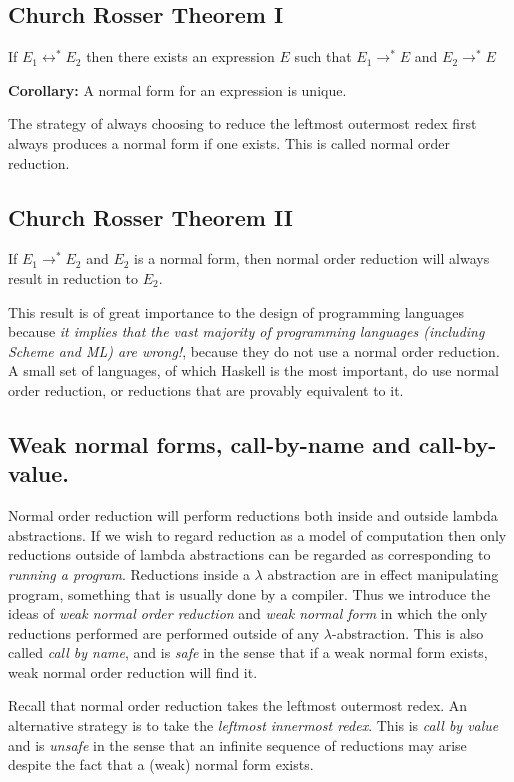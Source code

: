\subsection{Church Rosser Theorem I}

If $E_1\longleftrightarrow^*
E_2$ then there exists an expression $E$ such that
  $E_1\longrightarrow^* E$  and $E_2\longrightarrow^* E$

{\bf Corollary:} A normal form for an expression is unique.


The strategy of always choosing to reduce the leftmost outermost redex
first always produces a normal form if one exists. This is called normal
order reduction.

\subsection{Church Rosser Theorem II}
If $E_1\longrightarrow^* E_2$ and $E_2$ is a normal form, then normal order
reduction will always result in reduction to $E_2$.


This result is of great importance to the design of programming languages
because {\em it implies that the vast majority of programming languages
(including Scheme and ML) are {\em wrong}!}, because they do not use a
normal order reduction. A small set of languages, of which Haskell is the
most important, do use normal order reduction, or reductions that are
provably equivalent to it.

\subsection{Weak normal forms, call-by-name and call-by-value.}


Normal order reduction will perform reductions both inside and outside
lambda abstractions. If we wish to regard reduction as a model of
computation then only reductions outside of lambda abstractions can be
regarded as corresponding to {\em running a program}. Reductions inside a
$\lambda$ abstraction are in effect manipulating program, something that is
usually done by a compiler. Thus we introduce the ideas of {\em weak normal
order reduction} and {\em weak normal form} in which the only reductions
performed are performed outside of any $\lambda$-abstraction. This is also
called {\em call by name}, and is {\em safe} in the sense that if a
weak normal form exists, weak normal order reduction will find it.

Recall that normal order reduction takes the leftmost outermost redex. An
alternative strategy is to take the {\em leftmost innermost redex}. This is
{\em call by value} and is {\em unsafe} in the sense that an infinite
sequence of reductions may arise despite the fact that a (weak) normal form
exists.

